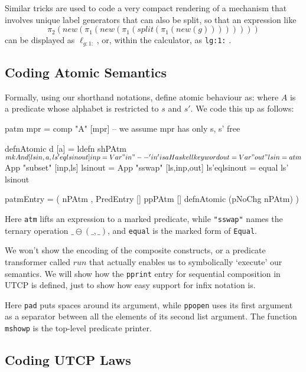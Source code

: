 Similar tricks are used to code a very compact rendering
of a mechanism that involves unique label generators
that can also be split, so that an expression like
\[
 \pi_2(new(\pi_1(new(\pi_1(split(\pi_1(new(g))))))))
\]
can be displayed as $\ell_{g:1:}$, or,
within the calculator, as \texttt{lg:1:} .


\subsection{Coding Atomic Semantics}

Formally, using our shorthand notations, define atomic behaviour as:
where $A$ is a predicate whose alphabet is restricted to $s$ and $s'$.
We code this up as follows:
\begin{code}
patm mpr = comp "A" [mpr] -- we assume mpr has only s, s' free

defnAtomic d [a] = ldefn shPAtm $ mkAnd [lsin,a,ls'eqlsinout]

inp = Var "in" -- 'in' is a Haskell keyword
out = Var "out"
lsin = atm $ App "subset" [inp,ls]
lsinout = App "sswap" [ls,inp,out]
ls'eqlsinout = equal ls' lsinout

patmEntry
 = ( nPAtm
   , PredEntry [] ppPAtm [] defnAtomic (pNoChg nPAtm) )
\end{code}
Here \texttt{atm} lifts an expression to a marked predicate,
while \texttt{"sswap"} names the ternary operation $\_\ominus(\_,\_)$,
and \texttt{equal} is the marked form of \texttt{Equal}.


We won't show the encoding of the composite constructs,
or a predicate transformer called $run$ that actually
enables us to symbolically `execute' our semantics.
We will show how the \texttt{pprint} entry for
sequential composition in UTCP is defined,
just to show how easy support for infix notation is.
Here \texttt{pad} puts spaces around its argument,
while \texttt{ppopen} uses its first argument as a
separator between all the elements of its second list argument.
The function \texttt{mshowp} is the top-level predicate printer.


\subsection{Coding UTCP Laws}

